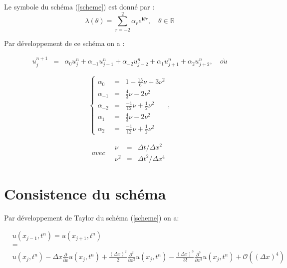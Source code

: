 \documentclass[a4paper,11pt]{article}
\begin{document}
Le symbole du schéma (\ref{scheme}) est donné par :
\begin{equation*}
\lambda(\theta) = \sum \limits_{r=-2}^{2} \alpha_{r} e^{\mathbf{i} \theta r}, \quad \theta \in \mathbb{R}
\end{equation*}

Par développement de ce schéma on a :

\begin{equation*}
    \begin{array}{rcl}
        u^{n+1}_{j} &=& \alpha_{0} u^{n}_{j} + \alpha_{-1} u^{n}_{j-1} + \alpha_{-2} u^{n}_{j-2} + \alpha_{1} u^{n}_{j+1}  + \alpha_{2} u^{n}_{j+2}, \quad o\grave{u}
    \end{array}
\end{equation*}

\begin{equation*}
    \left\{
    \begin{array}{rcl}
        \alpha_{0} &=& 1 - \scriptstyle \frac{15}{6} \nu + 3 \nu^{2} \\
        \alpha_{-1} &=& \scriptstyle \frac{4}{3} \nu - 2 \nu^{2} \\
        \alpha_{-2} &=& \scriptstyle \frac{-1}{12} \nu + \frac{1}{2} \nu^{2} \\
        \alpha_{1} &=& \scriptstyle \frac{4}{3} \nu - 2 \nu^{2} \\
        \alpha_{2} &=& \scriptstyle \frac{-1}{12} \nu + \frac{1}{2} \nu^{2}
    \end{array}
    \right.,
\end{equation*}

\begin{equation*}
    avec \quad
    \begin{array}{rcl}
        \nu &=& \Delta t/\Delta x^{2} \\
        \nu^{2} &=& \Delta t^{2}/\Delta x^{4}
    \end{array}
\end{equation*}


\section{Consistence du schéma}

Par développement de Taylor du schéma (\ref{scheme}) on a:

\begin{equation*}
    \begin{array}{rcl}
        & u(x_{j-1}, t^{n}) = u(x_{j+1}, t^{n}) & \\
        &=& \\
        & u(x_{j}, t^{n})
         - \Delta x \frac{\partial}{\partial x}u(x_{j}, t^{n})
         + \frac{(\Delta x)^{2}}{2} \frac{\partial^{2}}{\partial x^{2}}u(x_{j}, t^{n})
         - \frac{(\Delta x)^{3}}{3!} \frac{\partial^{3}}{\partial x^{3}}u(x_{j}, t^{n})
         + \mathcal{O}((\Delta x)^{4}) &
    \end{array}
\end{equation*}
\end{document}
